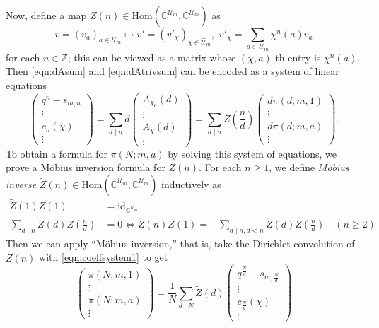 \documentclass[10pt,reqno]{amsproc}
\newcommand{\what}[1]{\widehat{#1}}
\newcommand{\Hom}{\mathrm{Hom}}
\newcommand{\id}{\mathrm{id}}
\newcommand{\bC}{\mathbb{C}}
\newcommand{\bZ}{\mathbb{Z}}
\newcommand{\scU}{\mathscr{U}}
\newcommand{\1}{\mathds{1}}	%
\theoremstyle{definition}
\theoremstyle{remark}
\begin{document}
Now, define a map \(Z(n) \in \Hom(\bC^{\scU_m}, \bC^{\what{\scU}_m})\) as
\begin{equation}
    v = (v_a)_{a \in \scU_m} \mapsto v' = (v'_\chi)_{\chi \in \what{\scU}_m}, \,\, v'_\chi = \sum_{a\in \scU_m} \chi^n(a) v_a
\end{equation}
for each \(n \in \bZ\); this can be viewed as a matrix whose \((\chi, a)\)-th entry is \(\chi^n(a)\).
Then \eqref{eqn:dAsum} and \eqref{eqn:dAtrivsum} can be encoded as a system of linear equations
\begin{equation}
\label{eqn:coeffsystem1}
    \begin{pmatrix}
        q^n - s_{m, n} \\
        \vdots \\
        c_n(\chi) \\
        \vdots
    \end{pmatrix} = \sum_{d \mid n} d \begin{pmatrix}
        A_{\chi_0}(d) \\ \vdots \\ A_\chi(d) \\ \vdots
    \end{pmatrix} = \sum_{d \mid n} Z\left(\frac{n}{d}\right) \begin{pmatrix}
        d \pi(d; m, 1) \\ \vdots \\ d \pi(d; m, a) \\ \vdots
    \end{pmatrix}.
\end{equation}
To obtain a formula for \(\pi(N; m, a)\) by solving this system of equations, we prove a M\"obius inversion formula for \(Z(n)\).
For each \(n \ge 1\), we define \emph{M\"obius inverse} \(\widetilde{Z}(n) \in \Hom(\bC^{\what{\scU}_m}, \bC^{\scU_m})\) inductively as
\begin{align}
    \widetilde{Z}(1) Z(1) &= \id_{\bC^{\scU_m}} \label{eqn:Ztilde_one} \\
    \sum_{d \mid n} \widetilde{Z}(d) Z\left(\frac{n}{d}\right) &= 0 \Leftrightarrow \widetilde{Z}(n) Z(1) = -\sum_{d \mid n, d < n} \widetilde{Z}(d) Z\left(\frac{n}{d}\right)\quad (n \ge 2) \label{eqn:Ztilde_rec}
\end{align}
Then we can apply ``M\"obius inversion,'' that is, take the Dirichlet convolution of \(\widetilde{Z}(n)\) with \eqref{eqn:coeffsystem1} to get
\begin{equation}
    \begin{pmatrix}
        \pi(N; m, 1) \\ \vdots \\ \pi(N; m, a) \\ \vdots
    \end{pmatrix} = \frac{1}{N} \sum_{d \mid N} \widetilde{Z}(d) \begin{pmatrix}
        q^{\frac{N}{d}} - s_{m, \frac{N}{d}} \\ \vdots \\ c_{\frac{N}{d}}(\chi) \\ \vdots
    \end{pmatrix}
\end{equation}
\end{document}
